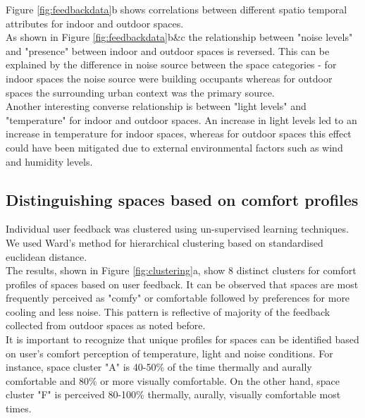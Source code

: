 Figure \ref{fig:feedbackdata}b shows correlations between different spatio temporal attributes for indoor and outdoor spaces.\\

As shown in Figure \ref{fig:feedbackdata}b\&c the relationship between "noise levels" and "presence" between indoor and outdoor spaces is reversed. This can be explained by the difference in noise source between the space categories - for indoor spaces the noise source were building occupants whereas for outdoor spaces the surrounding urban context was the primary source.\\

Another interesting converse relationship is between "light levels" and "temperature" for indoor and outdoor spaces. An increase in light levels led to an increase in temperature for indoor spaces, whereas for outdoor spaces this effect could have been mitigated due to external environmental factors such as wind and humidity levels.\\



\subsection{Distinguishing spaces based on comfort profiles}
\label{ch:userResults}

Individual user feedback was clustered using un-supervised learning techniques. We used Ward's method for hierarchical clustering based on standardised euclidean distance.\\

The results, shown in Figure \ref{fig:clustering}a, show 8 distinct clusters for comfort profiles of spaces based on user feedback. It can be observed that spaces are most frequently perceived as "comfy" or comfortable followed by preferences for more cooling and less noise. This pattern is reflective of majority of the feedback collected from outdoor spaces as noted before.\\

It is important to recognize that unique profiles for spaces can be identified based on user's comfort perception of temperature, light and noise conditions. For instance, space cluster "A" is 40-50\% of the time thermally and aurally comfortable and 80\% or more visually comfortable. On the other hand, space cluster "F" is perceived 80-100\% thermally, aurally, visually comfortable most times.\\           


